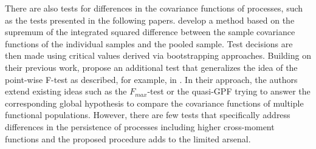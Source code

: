 \documentclass[12pt, a4paper]{article}
\theoremstyle{MAstyle} \newtheorem{assumption}{Assumption}[section]
\theoremstyle{MAstyle} \newtheorem{definition}{Definition}[section]
\theoremstyle{MAstyle} \newtheorem{theorem}{Theorem}[section]
\begin{document}
		
		There are also tests for differences in the covariance functions of processes, such as the tests presented in the following papers. 
		\cite{guo_testing_2018} develop a method based on the supremum of the integrated squared difference between the sample covariance functions of the individual samples and the pooled sample. Test decisions are then made using critical values derived via bootstrapping approaches.		Building on their previous work, \cite{guo_new_2019} propose an additional test that generalizes the idea of the point-wise F-test as described, for example, in \cite{ramsay_functional_2005}. In their approach, the authors extend existing ideas such as the $F_{\textit{max}}$-test or the quasi-GPF trying to answer the corresponding global hypothesis to compare the covariance functions of multiple functional populations.
		However, there are few tests that specifically address differences in the persistence of processes including higher cross-moment functions and the proposed procedure adds to the limited arsenal.
		
\end{document}
